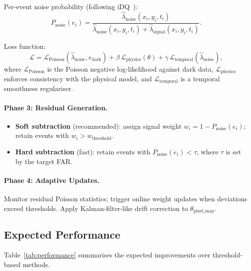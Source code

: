 \documentclass[12pt]{article}
\begin{document}
Per-event noise probability (following iDQ~\cite{D6}):
\begin{equation}
  P_\mathrm{noise}(e_i) = \frac{\hat{\lambda}_\mathrm{noise}(x_i, y_i, t_i)}{\hat{\lambda}_\mathrm{noise}(x_i, y_i, t_i) + \hat{\lambda}_\mathrm{signal}(x_i, y_i, t_i)}.
  \label{eq:pnoise}
\end{equation}

Loss function:
\begin{equation}
  \mathcal{L} = \mathcal{L}_\mathrm{Poisson}(\hat{\lambda}_\mathrm{noise}, e_\mathrm{dark})
  + \beta\,\mathcal{L}_\mathrm{physics}(\theta)
  + \gamma\,\mathcal{L}_\mathrm{temporal}(\hat{\lambda}_\mathrm{noise}),
\end{equation}
where $\mathcal{L}_\mathrm{Poisson}$ is the Poisson negative log-likelihood against dark data, $\mathcal{L}_\mathrm{physics}$ enforces consistency with the physical model, and $\mathcal{L}_\mathrm{temporal}$ is a temporal smoothness regulariser.

\paragraph{Phase 3: Residual Generation.}
\begin{itemize}
  \item \textbf{Soft subtraction} (recommended): assign signal weight $w_i = 1 - P_\mathrm{noise}(e_i)$; retain events with $w_i > w_\mathrm{threshold}$.
  \item \textbf{Hard subtraction} (fast): retain events with $P_\mathrm{noise}(e_i) < \tau$, where $\tau$ is set by the target FAR.
\end{itemize}

\paragraph{Phase 4: Adaptive Updates.}
Monitor residual Poisson statistics; trigger online weight updates when deviations exceed thresholds.
Apply Kalman-filter-like drift correction to $\theta_\mathrm{pixel\_map}$.

\subsection{Expected Performance}

Table~\ref{tab:performance} summarises the expected improvements over threshold-based methods.
\end{document}
